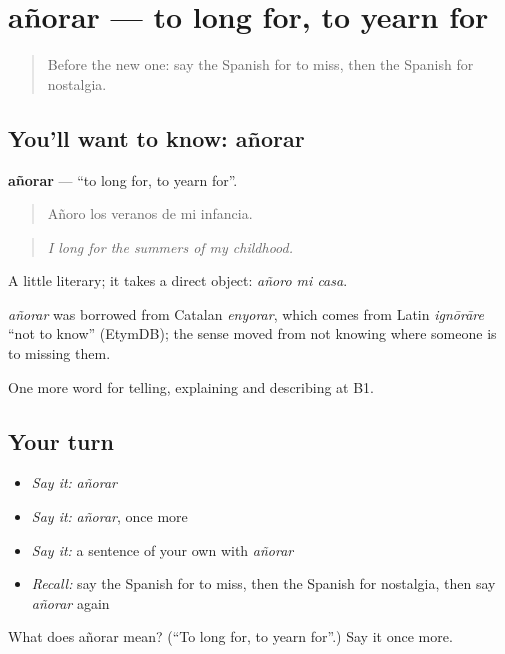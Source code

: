 \section[añorar]{añorar — to long for, to yearn for}

\label{lesson:ES-C709-anorar}



\begin{quote}
Before the new one: say the Spanish for to miss, then the Spanish for nostalgia.
\end{quote}

\subsection*{You'll want to know: añorar}
\textbf{añorar} — \textquotedblleft{}to long for, to yearn for\textquotedblright{}.

\begin{quote}
Añoro los veranos de mi infancia.
\end{quote}

\begin{quote}
\emph{I long for the summers of my childhood.}
\end{quote}

A little literary; it takes a direct object: \emph{añoro mi casa}.

\begin{cousinweb}
\emph{añorar} was borrowed from Catalan \emph{enyorar}, which comes from Latin \emph{ignōrāre} \textquotedblleft{}not to know\textquotedblright{} (EtymDB); the sense moved from not knowing where someone is to missing them.
\end{cousinweb}

\begin{grammarlens}[title={What you've built}]
One more word for telling, explaining and describing at B1.
\end{grammarlens}

\subsection*{Your turn}
\begin{itemize}
\raggedright
  \item \emph{Say it:} \emph{añorar}
  \item \emph{Say it:} \emph{añorar}, once more
  \item \emph{Say it:} a sentence of your own with \emph{añorar}
  \item \emph{Recall:} say the Spanish for to miss, then the Spanish for nostalgia, then say \emph{añorar} again
\end{itemize}

\begin{tcolorbox}[breakable,colback=teal!4,colframe=teal!35!black,title={Before you move on}]
What does añorar mean? (\textquotedblleft{}To long for, to yearn for\textquotedblright{}.) Say it once more.
\end{tcolorbox}
